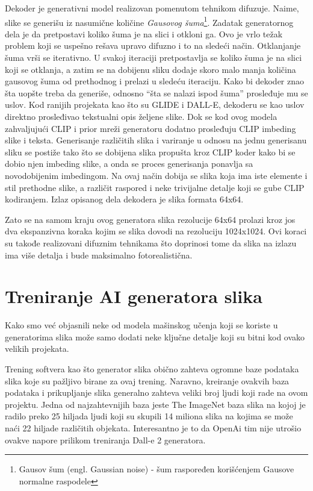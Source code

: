 \documentclass[12pt, letterpaper]{article}
\begin{document}
Dekoder je generativni model realizovan pomenutom tehnikom difuzuje. Naime, slike se generišu iz nasumične količine \textit{Gausovog šuma}\footnote{Gausov šum (engl. Gaussian noise) - šum raspoređen korišćenjem Gausove normalne raspodele}. Zadatak generatornog dela je da pretpostavi koliko šuma je na slici i otkloni ga. Ovo je vrlo težak problem koji se uspešno rešava upravo difuzno i to na sledeći način. Otklanjanje šuma vrši se iterativno\cite{gen1}. U svakoj iteraciji pretpostavlja se koliko šuma je na slici koji se otklanja, a zatim se na dobijenu sliku dodaje skoro malo manja količina gausovog šuma od prethodnog i prelazi u sledeću iteraciju. Kako bi dekoder znao šta uopšte treba da generiše, odnosno “šta se nalazi ispod šuma” prosleđuje mu se uslov. Kod ranijih projekata kao što su GLIDE i DALL-E\cite{openai_glide, openai_dali}, dekoderu se kao uslov direktno prosleđivao tekstualni opis željene slike. Dok se kod ovog modela zahvaljujući CLIP i prior mreži generatoru dodatno prosleđuju CLIP imbeding slike i teksta. Generisanje različitih slika i variranje u odnosu na jednu generisanu sliku se postiže tako što se dobijena slika propušta kroz CLIP koder kako bi se dobio njen imbeding slike, a onda se proces generisanja ponavlja sa novodobijenim imbedingom. Na ovaj način dobija se slika koja ima iste elemente i stil prethodne slike, a različit raspored i neke trivijalne detalje koji se gube CLIP kodiranjem. Izlaz opisanog dela dekodera je slika formata 64x64.

Zato se na samom kraju ovog generatora slika rezolucije 64x64 prolazi kroz jos dva ekspanzivna koraka kojim se slika dovodi na rezoluciju 1024x1024. Ovi koraci su takođe realizovani difuznim tehnikama što doprinosi tome da slika na izlazu ima više detalja i bude maksimalno fotorealistična.\cite{openai_dali}

\pagebreak

\section{Treniranje AI generatora slika}

Kako smo već objasnili neke od modela mašinskog učenja koji se koriste u generatorima slika može samo dodati neke ključne detalje koji su bitni kod ovako velikih projekata.

Trening softvera kao što generator slika obično zahteva ogromne baze podataka slika koje su pažljivo birane za ovaj trening. Naravno, kreiranje ovakvih baza podataka i prikupljanje slika generalno zahteva veliki broj ljudi koji rade na ovom projektu. Jedna od najzahtevnijih baza jeste The ImageNet baza slika na kojoj je radilo preko 25 hiljada ljudi koji su skupili 14 miliona slika na kojima se može naći 22 hiljade različitih objekata. Interesantno je to da OpenAi tim nije utrošio ovakve napore prilikom treniranja Dall-e 2 generatora. \cite{clip}
\end{document}
